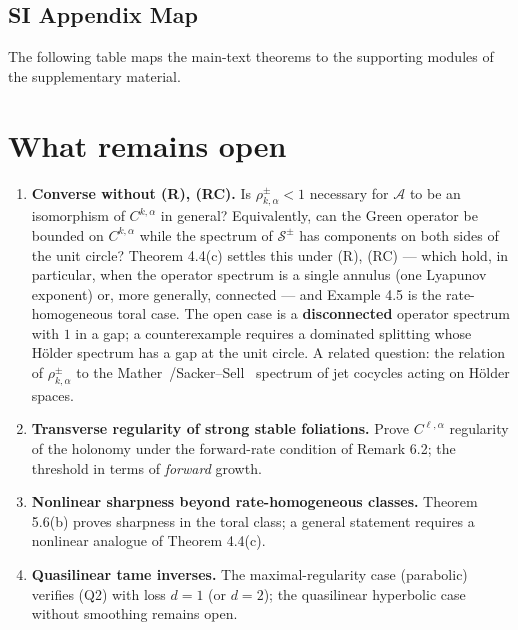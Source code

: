 \documentclass[11pt,a4paper]{article}
\theoremstyle{plain}
\theoremstyle{definition}
\theoremstyle{remark}
\numberwithin{equation}{section}
\numberwithin{figure}{section}
\begin{document}
\subsection*{SI Appendix Map}

The following table maps the main-text theorems to the supporting modules of the supplementary material.

\section{What remains open}

\begin{enumerate}
    \item \textbf{Converse without (R), (RC).} Is $\rho^\pm_{k,\alpha}<1$ necessary for $\mathcal A$ to be an isomorphism of $C^{k,\alpha}$ in general? Equivalently, can the Green operator be bounded on $C^{k,\alpha}$ while the spectrum of $\mathcal S^\pm$ has components on both sides of the unit circle? Theorem 4.4(c) settles this under (R), (RC) — which hold, in particular, when the operator spectrum is a single annulus (one Lyapunov exponent) or, more generally, connected — and Example 4.5 is the rate-homogeneous toral case. The open case is a \textbf{disconnected} operator spectrum with $1$ in a gap; a counterexample requires a dominated splitting whose Hölder spectrum has a gap at the unit circle. A related question: the relation of $\rho^\pm_{k,\alpha}$ to the Mather~\cite{mather1968}/Sacker–Sell~\cite{sacker1978} spectrum of jet cocycles acting on Hölder spaces.

    \item \textbf{Transverse regularity of strong stable foliations.} Prove $C^{\ell,\alpha}$ regularity of the holonomy under the forward-rate condition of Remark 6.2; the threshold in terms of \textit{forward} growth.

    \item \textbf{Nonlinear sharpness beyond rate-homogeneous classes.} Theorem 5.6(b) proves sharpness in the toral class; a general statement requires a nonlinear analogue of Theorem 4.4(c).

    \item \textbf{Quasilinear tame inverses.} The maximal-regularity case (parabolic) verifies (Q2) with loss \(d=1\) (or \(d=2\)); the quasilinear hyperbolic case without smoothing remains open.


\end{enumerate}
\end{document}
